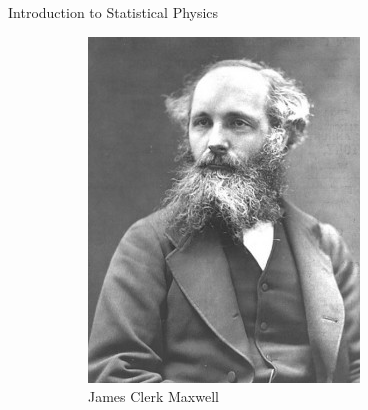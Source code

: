 \documentclass{beamer}
\begin{document}
\begin{frame}{Introduction to Statistical Physics}
\begin{figure}[h!]
\begin{subfigure}[b]{0.25\linewidth}
      \includegraphics[width=\linewidth]{figures/maxwell.jpeg}
      \caption{James Clerk Maxwell~\cite{maxwell}}
    \end{subfigure}%
    \quad
    \begin{subfigure}[b]{0.25\linewidth}

\end{subfigure}
\end{figure}
\end{frame}
\end{document}

